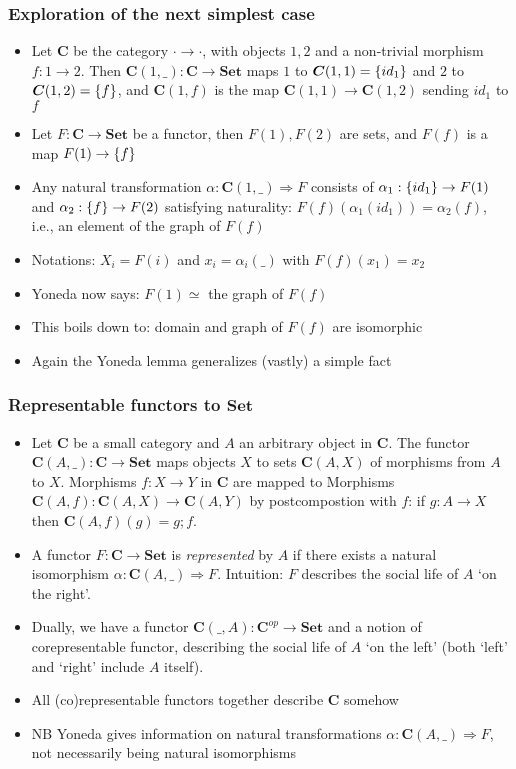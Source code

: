 \documentclass[handout]{beamer}
\newcommand{\To}{\Rightarrow}
\newcommand{\bfsf}[1]{{\boldsymbol{#1}}}
\newcommand{\Set}{\bfsf{Set}}
\newcommand{\CC}{\bfsf{C}}
\begin{document}
\frame
  {   
    \frametitle{Exploration of the next simplest case}\label{Yon:Triv}

 \begin{itemize}[<+->]
\item Let $\CC$ be the category ${\cdot}{\to}{\cdot}$, with objects $1,2$ and
a non-trivial morphism $f:1\to 2$. Then $\CC(1,\_):\CC\to\Set$ maps
$1$ to $\CC(1,1) = \set{id_1}$ and $2$ to $\CC(1,2) = \set{f}$, and
$\CC(1,f)$ is the map $\CC(1,1)\to\CC(1,2)$ sending $id_1$ to $f$  
\item Let $F:\CC\to\Set$ be a functor, then $F(1), F(2)$ are sets, and
$F(f)$ is a map ${F(1)}\to\{f\}$
\item Any natural transformation $\alpha: \CC(1,\_)\To F$ consists of
$\alpha_1: \{id_1\} \to F(1)$ and $\alpha_2: \{f\} \to F(2)$ satisfying 
naturality: $F(f)(\alpha_1(id_1)) = \alpha_2(f)$, i.e., an element of the graph of $F(f)$
\item Notations: $X_i = F(i)$ and $x_i =\alpha_i(\_)$ with %
$F(f)(x_1) = x_2$
\item Yoneda now says:   $F(1) \simeq{}$ the graph of $F(f)$
\item This boils down to: domain and graph of $F(f)$ are isomorphic
\item Again  the Yoneda lemma generalizes (vastly) a simple fact
 \end{itemize}

 }

\frame
  {   
    \frametitle{Representable functors to $\Set$}\label{Yon:ReprFun}

 \begin{itemize}[<+->]
\item Let $\CC$ be a small category and $A$ an arbitrary object in $\CC$. 
The functor  $\CC(A,\_):\CC\to\Set$ maps objects $X$ to sets $\CC(A,X)$
of morphisms from $A$ to $X$. Morphisms $f: X\to Y$ in $\CC$ are
mapped to Morphisms $\CC(A,f): \CC(A,X)\to\CC(A,Y)$ by
postcompostion with $f$: if $g:A\to X$ then $\CC(A,f)(g) = g;f$.
\item A functor $F:\CC\to\Set$ is \emph{represented} by $A$ if
there exists a natural isomorphism $\alpha: \CC(A,\_)\To F$.
Intuition: $F$ describes the social life of $A$ `on the right'.
\item Dually, we have a functor $\CC(\_,A):\CC^{op}\to\Set$
and a notion of corepresentable functor, 
describing the social life of $A$ `on the left' 
(both `left' and `right' include $A$ itself).
\item All (co)representable functors together describe $\CC$ somehow
\item NB Yoneda gives information on natural transformations 
$\alpha: \CC(A,\_)\To F$, not necessarily being natural isomorphisms

\end{itemize}

 }
\end{document}
